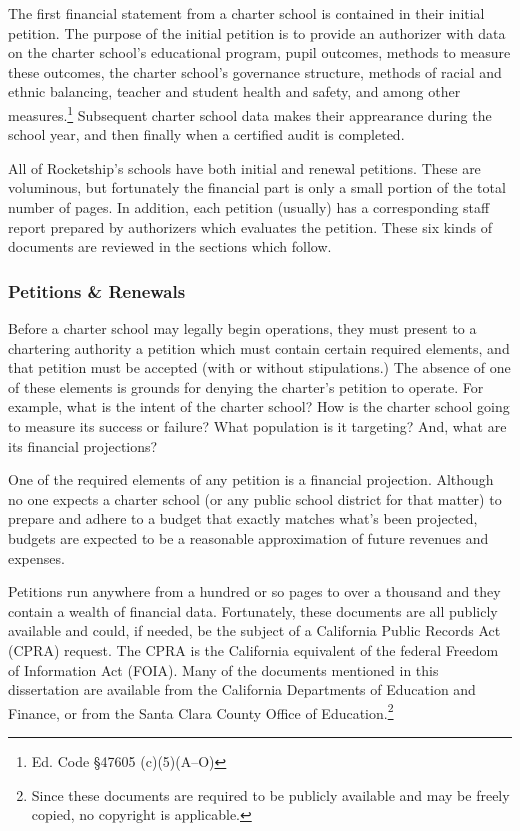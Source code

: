 The first financial statement from a charter school is contained in their initial petition. The purpose of the initial petition is to provide an authorizer with data on the charter school's educational program, pupil outcomes, methods to measure these outcomes, the charter school's governance structure, methods of racial and ethnic balancing, teacher and student health and safety, and among other measures.\footnote{Ed. Code §47605 (c)(5)(A–O)} Subsequent charter school data makes their apprearance during the school year, and then finally when a certified audit is completed.

All of Rocketship's schools have both initial and renewal petitions. These are voluminous, but fortunately the financial part is only a small portion of the total number of pages. In addition, each petition (usually) has a corresponding staff report prepared by authorizers which evaluates the petition. These six kinds of documents are reviewed in the sections which follow.

\subsubsection{Petitions \& Renewals}\label{sec:cs-petitions-renewals}\indent%

Before a charter school may legally begin operations, they must present to a chartering authority a petition which must contain certain required elements, and that petition must be accepted (with or without stipulations.) The absence of one of these elements is grounds for denying the charter's petition to operate. For example, what is the intent of the charter school? How is the charter school going to measure its success or failure? What population is it targeting? And, what are its financial projections? 

One of the required elements of any petition is a financial projection. Although no one expects a charter school (or any public school district for that matter) to prepare and adhere to a budget that exactly matches what's been projected, budgets are expected to be a reasonable approximation of future revenues and expenses.

Petitions run anywhere from a hundred or so pages to over a thousand and they contain a wealth of financial data. Fortunately, these documents are all publicly available and could, if needed, be the subject of a California Public Records Act (CPRA) request. The CPRA is the California equivalent of the federal Freedom of Information Act (FOIA). Many of the documents mentioned in this dissertation are available from the California Departments of Education and Finance, or from the Santa Clara County Office of Education.\footnote{Since these documents are required to be publicly available and may be freely copied, no copyright is applicable.}

